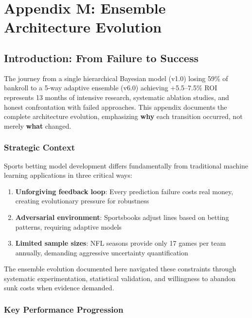 \chapter{Appendix M: Ensemble Architecture Evolution}
\label{appendix:architecture-evolution}

\section{Introduction: From Failure to Success}

The journey from a single hierarchical Bayesian model (v1.0) losing 59\% of bankroll to a 5-way adaptive ensemble (v6.0) achieving +5.5--7.5\% ROI represents 13 months of intensive research, systematic ablation studies, and honest confrontation with failed approaches. This appendix documents the complete architecture evolution, emphasizing \textbf{why} each transition occurred, not merely \textbf{what} changed.

\subsection{Strategic Context}

Sports betting model development differs fundamentally from traditional machine learning applications in three critical ways:

\begin{enumerate}
\item \textbf{Unforgiving feedback loop}: Every prediction failure costs real money, creating evolutionary pressure for robustness
\item \textbf{Adversarial environment}: Sportsbooks adjust lines based on betting patterns, requiring adaptive models
\item \textbf{Limited sample sizes}: NFL seasons provide only 17 games per team annually, demanding aggressive uncertainty quantification
\end{enumerate}

The ensemble evolution documented here navigated these constraints through systematic experimentation, statistical validation, and willingness to abandon sunk costs when evidence demanded.

\subsection{Key Performance Progression}

